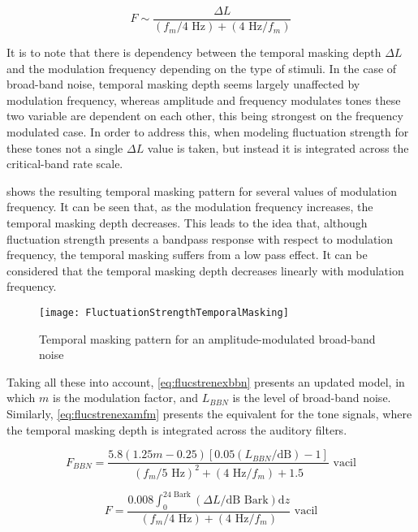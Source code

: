 \documentclass[../main.tex]{subfiles}
\begin{document}
\begin{theoreticalbackground}
\begin{equation}
    F \sim \frac{\Delta L}{(f_{m}/4\text{ Hz}) + (4\text{ Hz}/f_{m})}
    \label{eq:flucstrentempmaskmodfreq}
\end{equation}

It is to note that there is dependency between the temporal masking depth
$\Delta L$ and the modulation frequency depending on the type of stimuli. In the
case of broad-band noise, temporal masking depth seems largely unaffected by
modulation frequency, whereas amplitude and frequency modulates tones these two
variable are dependent on each other, this being strongest on the frequency
modulated case. In order to address this, when modeling fluctuation strength
for these tones not a single $\Delta L$ value is taken, but instead it is
integrated across the critical-band rate scale.

 shows the resulting temporal masking pattern for
several values of modulation frequency. It can be seen that, as the modulation
frequency increases, the temporal masking depth decreases. This leads to the
idea that, although fluctuation strength presents a bandpass response with
respect to modulation frequency, the temporal masking suffers from a low pass
effect. It can be considered that the temporal masking depth decreases linearly
with modulation frequency.

\begin{figure}
    \centering
    \texttt{[image: FluctuationStrengthTemporalMasking]}
    \caption{Temporal masking pattern for an amplitude-modulated broad-band
        noise \cite[pp. 255]{Fastl2007Psychoacoustics}}
    \label{fig:flucstrenmasking}
\end{figure}

Taking all these into account, \cref{eq:flucstrenexbbn} presents an
updated model, in which $m$ is the modulation factor, and $L_{BBN}$ is the level
of broad-band noise. Similarly, \cref{eq:flucstrenexamfm} presents the
equivalent for the tone signals, where the temporal masking depth is integrated
across the auditory filters.

\begin{equation}
    F_{BBN} = \frac{5.8(1.25m-0.25)[0.05(L_{BBN}/\text{dB})-1]}
        {(f_{m}/5\text{ Hz})^2+(4\text{ Hz}/f_{m})+1.5} \text{ vacil}
    \label{eq:flucstrenexbbn}
\end{equation}

\begin{equation}
    F = \frac{0.008 \int_0^{24\text{ Bark}}(\Delta L/\text{dB Bark})\mathrm{d}z}
        {(f_{m}/4\text{ Hz})+(4\text{ Hz}/f_{m})} \text{ vacil}
    \label{eq:flucstrenexamfm}
\end{equation}


\end{theoreticalbackground}
\end{document}
